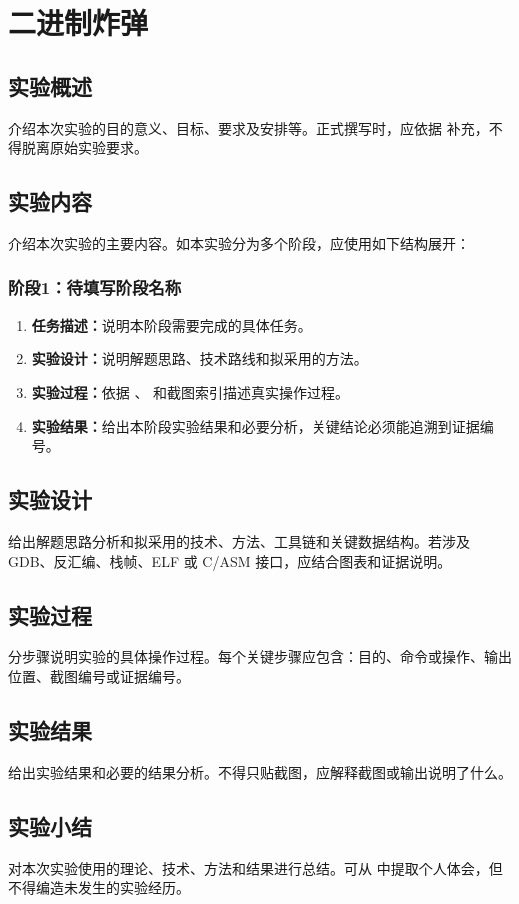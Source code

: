 \section{二进制炸弹}

\subsection{实验概述}

介绍本次实验的目的意义、目标、要求及安排等。正式撰写时，应依据  补充，不得脱离原始实验要求。

\subsection{实验内容}

介绍本次实验的主要内容。如本实验分为多个阶段，应使用如下结构展开：

\subsubsection{阶段1：待填写阶段名称}

\begin{enumerate}[label=\arabic*.]
    \item \textbf{任务描述：}说明本阶段需要完成的具体任务。
    \item \textbf{实验设计：}说明解题思路、技术路线和拟采用的方法。
    \item \textbf{实验过程：}依据 、 和截图索引描述真实操作过程。
    \item \textbf{实验结果：}给出本阶段实验结果和必要分析，关键结论必须能追溯到证据编号。
\end{enumerate}

\subsection{实验设计}

给出解题思路分析和拟采用的技术、方法、工具链和关键数据结构。若涉及 GDB、反汇编、栈帧、ELF 或 C/ASM 接口，应结合图表和证据说明。

\subsection{实验过程}

分步骤说明实验的具体操作过程。每个关键步骤应包含：目的、命令或操作、输出位置、截图编号或证据编号。

\subsection{实验结果}

给出实验结果和必要的结果分析。不得只贴截图，应解释截图或输出说明了什么。

\subsection{实验小结}

对本次实验使用的理论、技术、方法和结果进行总结。可从  中提取个人体会，但不得编造未发生的实验经历。
